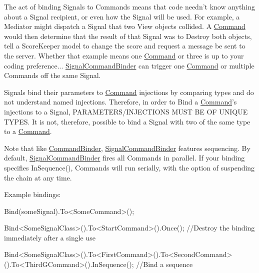 The act of binding Signals to Commands means that code needn't know anything about a Signal recipient, or even how the Signal will be used. For example, a Mediator might dispatch a Signal that two View objects collided. A \hyperlink{classstrange_1_1extensions_1_1command_1_1impl_1_1_command}{Command} would then determine that the result of that Signal was to Destroy both objects, tell a Score\-Keeper model to change the score and request a message be sent to the server. Whether that example means one \hyperlink{classstrange_1_1extensions_1_1command_1_1impl_1_1_command}{Command} or three is up to your coding preference... \hyperlink{classstrange_1_1extensions_1_1command_1_1impl_1_1_signal_command_binder}{Signal\-Command\-Binder} can trigger one \hyperlink{classstrange_1_1extensions_1_1command_1_1impl_1_1_command}{Command} or multiple Commands off the same Signal.

Signals bind their parameters to \hyperlink{classstrange_1_1extensions_1_1command_1_1impl_1_1_command}{Command} injections by comparing types and do not understand named injections. Therefore, in order to Bind a \hyperlink{classstrange_1_1extensions_1_1command_1_1impl_1_1_command}{Command}'s injections to a Signal, P\-A\-R\-A\-M\-E\-T\-E\-R\-S/\-I\-N\-J\-E\-C\-T\-I\-O\-N\-S M\-U\-S\-T B\-E O\-F U\-N\-I\-Q\-U\-E T\-Y\-P\-E\-S. It is not, therefore, possible to bind a Signal with two of the same type to a \hyperlink{classstrange_1_1extensions_1_1command_1_1impl_1_1_command}{Command}.

Note that like \hyperlink{classstrange_1_1extensions_1_1command_1_1impl_1_1_command_binder}{Command\-Binder}, \hyperlink{classstrange_1_1extensions_1_1command_1_1impl_1_1_signal_command_binder}{Signal\-Command\-Binder} features sequencing. By default, \hyperlink{classstrange_1_1extensions_1_1command_1_1impl_1_1_signal_command_binder}{Signal\-Command\-Binder} fires all Commands in parallel. If your binding specifies {\ttfamily In\-Sequence()}, Commands will run serially, with the option of suspending the chain at any time.

Example bindings\-: \begin{DoxyVerb}Bind(someSignal).To<SomeCommand>();

Bind<SomeSignalClass>().To<StartCommand>().Once(); //Destroy the binding immediately after a single use

Bind<SomeSignalClass>().To<FirstCommand>().To<SecondCommand>().To<ThirdGCommand>().InSequence(); //Bind a sequence
\end{DoxyVerb}


